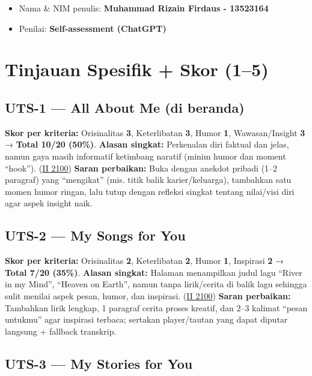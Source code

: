 \documentclass[
  letterpaper,
  DIV=11,
  numbers=noendperiod]{scrreprt}
\providecommand{\tightlist}{%
  \setlength{\itemsep}{0pt}\setlength{\parskip}{0pt}}
\begin{document}
\begin{itemize}
\tightlist
\item
  Nama \& NIM penulis: \textbf{Muhammad Rizain Firdaus - 13523164}
\item
  Penilai: \textbf{Self-assessment (ChatGPT)}
\end{itemize}

\section{Tinjauan Spesifik + Skor
(1--5)}\label{tinjauan-spesifik-skor-15}

\subsection{UTS-1 --- All About Me (di
beranda)}\label{uts-1-all-about-me-di-beranda}

\textbf{Skor per kriteria:} Orisinalitas \textbf{3}, Keterlibatan
\textbf{3}, Humor \textbf{1}, Wawasan/Insight \textbf{3} → \textbf{Total
10/20 (50\%)}. \textbf{Alasan singkat:} Perkenalan diri faktual dan
jelas, namun gaya masih informatif ketimbang naratif (minim humor dan
moment ``hook''). (\href{https://ii-2100.github.io/all-about-me/}{II
2100}) \textbf{Saran perbaikan:} Buka dengan anekdot pribadi (1--2
paragraf) yang ``mengikat'' (mis. titik balik karier/keluarga),
tambahkan satu momen humor ringan, lalu tutup dengan refleksi singkat
tentang nilai/visi diri agar aspek insight naik.

\subsection{UTS-2 --- My Songs for You}\label{uts-2-my-songs-for-you-2}

\textbf{Skor per kriteria:} Orisinalitas \textbf{2}, Keterlibatan
\textbf{2}, Humor \textbf{1}, Inspirasi \textbf{2} → \textbf{Total 7/20
(35\%)}. \textbf{Alasan singkat:} Halaman menampilkan judul lagu ``River
in my Mind'', ``Heaven on Earth'', namun tanpa lirik/cerita di balik
lagu sehingga sulit menilai aspek pesan, humor, dan inspirasi.
(\href{https://ii-2100.github.io/all-about-me/My_Song_for_You/index.html}{II
2100}) \textbf{Saran perbaikan:} Tambahkan lirik lengkap, 1 paragraf
cerita proses kreatif, dan 2--3 kalimat ``pesan untukmu'' agar inspirasi
terbaca; sertakan player/tautan yang dapat diputar langsung + fallback
transkrip.

\subsection{UTS-3 --- My Stories for
You}\label{uts-3-my-stories-for-you-2}
\end{document}
